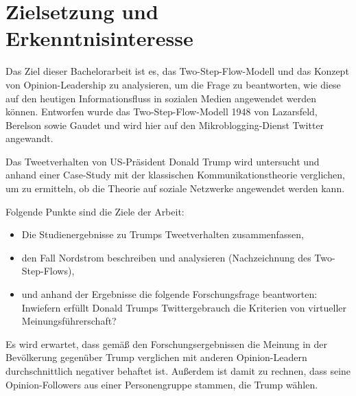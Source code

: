 \section{Zielsetzung und Erkenntnisinteresse}
\label{sec:zielsetzung-und-erkenntnisinteresse}

Das Ziel dieser Bachelorarbeit ist es, das Two-Step-Flow-Modell und das Konzept von Opinion-Leadership zu analysieren, um die Frage zu beantworten, wie diese auf den heutigen Informationsfluss in sozialen Medien angewendet werden können. Entworfen wurde das Two-Step-Flow-Modell 1948 von Lazarsfeld, Berelson sowie Gaudet und wird hier auf den Mikroblogging-Dienst Twitter angewandt.

Das Tweetverhalten von US-Präsident Donald Trump wird untersucht und anhand einer Case-Study mit der klassischen Kommunikationstheorie verglichen, um zu ermitteln, ob die Theorie auf soziale Netzwerke angewendet werden kann.

Folgende Punkte sind die Ziele der Arbeit:

\begin{itemize}
    \item Die Studienergebnisse zu Trumps Tweetverhalten zusammenfassen,
    \item den Fall Nordstrom beschreiben und analysieren (Nachzeichnung des Two-Step-Flows),
    \item und anhand der Ergebnisse die folgende Forschungsfrage beantworten: Inwiefern erfüllt Donald Trumps Twittergebrauch die Kriterien von virtueller Meinungsführerschaft?
\end{itemize}

Es wird erwartet, dass gemäß den Forschungsergebnissen die Meinung in der Bevölkerung gegenüber Trump verglichen mit anderen Opinion-Leadern durchschnittlich negativer behaftet ist. Außerdem ist damit zu rechnen, dass seine Opinion-Followers aus einer Personengruppe stammen, die Trump wählen.